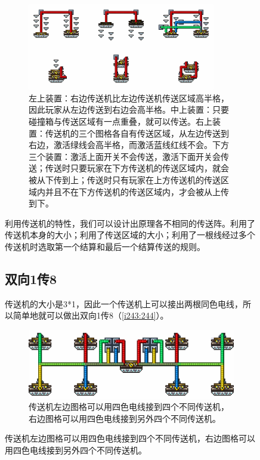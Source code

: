 \begin{figure}[!ht]
\begin{figure}[!ht]
\begin{center}
\includegraphics[width=0.9\textwidth]{images/218.png}
\end{center}
\caption{左上装置：右边传送机比左边传送机传送区域高半格，因此玩家从左边传送到右边会高半格。中上装置：只要碰撞箱与传送区域有一点重叠，就可以传送。右上装置：传送机的三个图格各自有传送区域，从左边传送到右边，激活绿线会高半格，而激活蓝线红线不会。下方三个装置：激活上面开关不会传送，激活下面开关会传送；传送时只要玩家在下方传送机的传送区域内，就会被从下传到上；传送时只有玩家在上方传送机的传送区域内并且不在下方传送机的传送区域内，才会被从上传到下。}
\label{i217:218}
\end{figure}

利用传送机的特性，我们可以设计出原理各不相同的传送阵。利用了传送机本身的大小；利用了传送区域的大小；利用了一根线经过多个传送机时选取第一个结算和最后一个结算传送的规则。

\subsection{双向1传8}\label{sec11}
传送机的大小是3*1，因此一个传送机上可以接出两根同色电线，所以简单地就可以做出双向1传8（\autoref{i243:244}）。

\begin{figure}[!ht]
\centering
\includegraphics{images/244.png}
\caption{传送机左边图格可以用四色电线接到四个不同传送机，右边图格可以用四色电线接到另外四个不同传送机。}
\label{i243:244}
\end{figure}


\end{figure}
